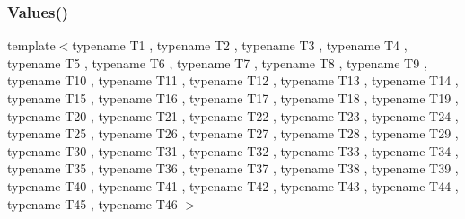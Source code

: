 \mbox{\label{namespacetesting_a8f5536906a9d6780467c8ae53a420dad}} 
\subsubsection{\texorpdfstring{Values()}{Values()}\hspace{0.1cm}{\footnotesize\ttfamily [47/51]}}
{\footnotesize\ttfamily template$<$typename T1 , typename T2 , typename T3 , typename T4 , typename T5 , typename T6 , typename T7 , typename T8 , typename T9 , typename T10 , typename T11 , typename T12 , typename T13 , typename T14 , typename T15 , typename T16 , typename T17 , typename T18 , typename T19 , typename T20 , typename T21 , typename T22 , typename T23 , typename T24 , typename T25 , typename T26 , typename T27 , typename T28 , typename T29 , typename T30 , typename T31 , typename T32 , typename T33 , typename T34 , typename T35 , typename T36 , typename T37 , typename T38 , typename T39 , typename T40 , typename T41 , typename T42 , typename T43 , typename T44 , typename T45 , typename T46 $>$ \\
}
